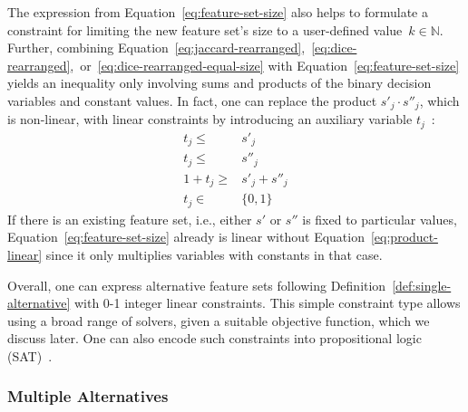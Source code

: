 \documentclass{article}
\theoremstyle{definition}
\begin{document}
%
The expression from Equation~\ref{eq:feature-set-size} also helps to formulate a constraint for limiting the new feature set's size to a user-defined value~$k \in \mathbb{N}$.
Further, combining Equation~\ref{eq:jaccard-rearranged},~\ref{eq:dice-rearranged},~or~\ref{eq:dice-rearranged-equal-size} with Equation~\ref{eq:feature-set-size} yields an inequality only involving sums and products of the binary decision variables and constant values.
In fact, one can replace the product $s'_j \cdot s''_j$, which is non-linear, with linear constraints by introducing an auxiliary variable $t_j$~\cite{mosek2022modeling}:
%
\begin{equation}
	\begin{aligned}
		t_j \leq& s'_j \\
		t_j \leq& s''_j \\
		1 + t_j \geq& s'_j + s''_j \\
		t_j \in& \{0,1\}
	\end{aligned}
	\label{eq:product-linear}
\end{equation}
%
If there is an existing feature set, i.e., either $s'$ or $s''$ is fixed to particular values, Equation~\ref{eq:feature-set-size} already is linear without Equation~\ref{eq:product-linear} since it only multiplies variables with constants in that case.

Overall, one can express alternative feature sets following Definition~\ref{def:single-alternative} with 0-1 integer linear constraints.
This simple constraint type allows using a broad range of solvers, given a suitable objective function, which we discuss later.
One can also encode such constraints into propositional logic (SAT)~\cite{ulrich2022selecting}.

\subsubsection{Multiple Alternatives}
\label{sec:approach:constraints:multiple}
\end{document}
